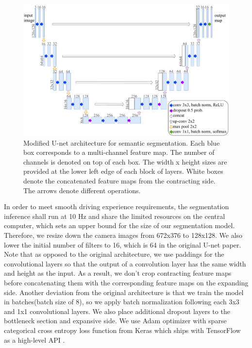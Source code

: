\begin{figure}[h]
  \centering
  \includegraphics[width=1.0\textwidth]{figures/unet-architecture.pdf}
  \caption{Modified U-net architecture for semantic segmentation. Each blue box
  corresponds to a multi-channel feature map. The number of channels is
  denoted on top of each box. The width x height sizes are provided at the
  lower left edge of each block of layers. White boxes denote the
  concatenated feature maps from the contracting side. The arrows denote
  different operations.}
  \label{figure:unet-architecture}
\end{figure}

In order to meet smooth driving experience requirements, the segmentation
inference shall run at 10 Hz and share the limited resources on the central
computer, which sets an upper bound for the size of our segmentation model.
Therefore, we resize down the camera images from 672x376 to 128x128. We also
lower the initial number of filters to 16, which is 64 in the original U-net
paper. Note that as opposed to the original architecture, we use paddings for
the convolutional layers so that the output of a convolution layer has the same
width and height as the input. As a result, we don't crop contracting feature
maps before concatenating them with the corresponding feature maps on the
expanding side.  Another deviation from the original architecture is that we
train the model in batches(batch size of 8), so we apply batch normalization
following each 3x3 and 1x1 convolutional layers. We also place additional
dropout layers to the bottleneck section and expansive side. We use Adam
optimizer with sparse categorical cross entropy loss function from Keras which
ships with TensorFlow as a high-level API \cite{cite7, cite8}.

